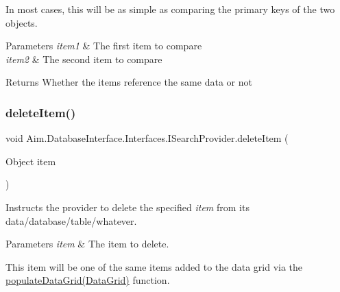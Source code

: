 In most cases, this will be as simple as comparing the primary keys of the two objects. 


\begin{DoxyParams}{Parameters}
{\em item1} & The first item to compare\\
\hline
{\em item2} & The second item to compare\\
\hline
\end{DoxyParams}
\begin{DoxyReturn}{Returns}
Whether the items reference the same data or not
\end{DoxyReturn}
\mbox{\label{interface_aim_1_1_database_interface_1_1_interfaces_1_1_i_search_provider_a553f73f7ca4bdb9c72d1ba047500efe5}} 
\subsubsection{\texorpdfstring{delete\+Item()}{deleteItem()}}
{\footnotesize\ttfamily void Aim.\+Database\+Interface.\+Interfaces.\+I\+Search\+Provider.\+delete\+Item (\begin{DoxyParamCaption}\item[{Object}]{item }\end{DoxyParamCaption})}



Instructs the provider to delete the specified {\itshape item}  from it\textquotesingle{}s data/database/table/whatever. 


\begin{DoxyParams}{Parameters}
{\em item} & The item to delete.\\
\hline
\end{DoxyParams}
This item will be one of the same items added to the data grid via the \mbox{\hyperlink{interface_aim_1_1_database_interface_1_1_interfaces_1_1_i_search_provider_a5f8c9967784a7d938d79d7ffd2ce6628}{populate\+Data\+Grid(\+Data\+Grid)}} function. \mbox{\label{interface_aim_1_1_database_interface_1_1_interfaces_1_1_i_search_provider_aebe4e5ec46e04e7aa3babfe8fcea5269}} 
